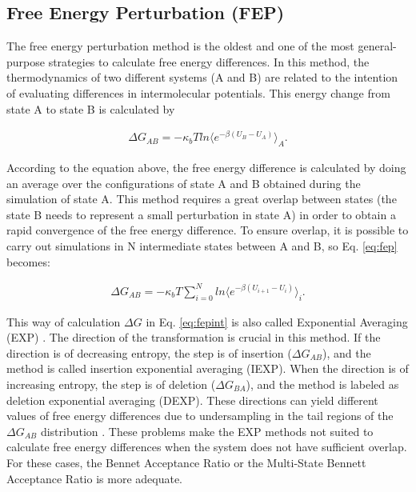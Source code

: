 \subsection{Free Energy Perturbation (FEP)}
The free energy perturbation method \cite{zwanzig1954} is the oldest and one of the most general-purpose strategies to calculate free energy differences. In this method, the thermodynamics of two different systems (A and B) are related to the intention of evaluating differences in intermolecular potentials. This energy change from state A to state B is calculated by  

\begin{equation}
\label{eq:fep}
\begin{aligned}
\Delta G_{AB} = -\kappa_{b}T ln \langle{e^{-\beta (U_{B}-U_{A})}}\rangle_{A} .
\end{aligned}
\end{equation}

According to the equation above, the free energy difference is calculated by doing an average over the configurations of state A and B obtained during the simulation of state A. This method requires a great overlap between states (the state B needs to represent a small perturbation in state A) in order to obtain a rapid convergence of the free energy difference. To ensure overlap, it is possible to carry out simulations in N intermediate states between A and B, so Eq. \eqref{eq:fep} becomes:

\begin{equation}
\label{eq:fepint}
\begin{aligned}
\Delta G_{AB} = -\kappa_{b}T  \sum_{i=0}^{N}
ln \langle {e^{-\beta (U_{i+1}-U_{i})}} \rangle_{i} .
\end{aligned}
\end{equation}

This way of calculation $\Delta G$ in Eq. \ref{eq:fepint} is also called Exponential Averaging (EXP) \cite{zwanzig1955,bareva}. The direction of the transformation is crucial in this method. If the direction is of decreasing entropy, the step is of insertion ($\Delta G_{AB}$), and the method is called insertion exponential averaging (IEXP). When the direction is of increasing entropy, the step is of deletion ($\Delta G_{BA}$), and the method is labeled as deletion exponential averaging (DEXP). These directions can yield different values of free energy differences due to undersampling in the tail regions of the $\Delta G_{AB}$ distribution \cite{klimovich,pohorille2010}. These problems make the EXP methods not suited to calculate free energy differences when the system does not have sufficient overlap. For these cases, the Bennet Acceptance Ratio or the Multi-State Bennett Acceptance Ratio is more adequate.   

